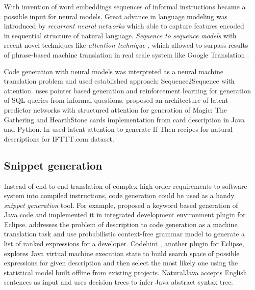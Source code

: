 With invention of word embeddings \parencite{bengio2003neural} sequences of informal instructions became a possible input for neural models. Great advance in language modeling was introduced by \emph{recurrent neural networks} \parencite{sundermeyer2012lstm, hochreiter1997long, Jozefowicz2016, Gers2001} which able to capture features encoded in sequential structure of natural language. \emph{Sequence to sequence models} \parencite{NIPS2014_5346} with recent novel techniques like \emph{attention technique} \parencite{Luong2015, Jean2014, Bahdanau2014}, which allowed to surpass results of phrase-based machine translation in real scale system like Google Translation \parencite{Wu2016}.

Code generation with neural models was interpreted as a neural machine translation problem and used established approach: Sequence2Sequence with attention. \cite{Zhong2017} uses pointer based generation and reinforcement learning for generation of SQL queries from informal questions. \cite{Ling2016} proposed an architecture of latent predictor networks with structured attention for generation of Magic: The Gathering and HearthStone cards implementation from card description in Java and Python. In \cite{Chen2016} used latent attention to generate If-Then recipes for natural descriptions for IFTTT.com dataset.

\subsection{Snippet generation}

Instead of end-to-end translation of complex high-order requirements to software system into compiled instructions, code generation could be used as a handy \emph{snippet generation} tool. For example, \cite{little2009keyword} proposed a keyword based generation of Java code and implemented it in integrated development environment plugin for Eclipse. \cite{Gvero2015} addresses the problem of description to code generation as a machine translation task and use probabilistic context-free grammar model to generate a list of ranked expressions for a developer. Codehint \parencite{Galenson2014}, another plugin for Eclipse, explores Java virtual machine execution state to build search space of possible expressions for given description and then select the most likely one using the statistical model built offline from existing projects. NaturalJava \parencite{Price2000} accepts English sentences as input and uses decision trees to infer Java abstract syntax tree.

